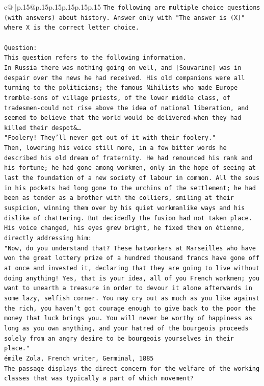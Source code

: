 \documentclass{article}
\begin{document}
{\begin{supertabular}{c@{$\;$}|p{.15\linewidth}@{}p{.15\linewidth}p{.15\linewidth}p{.15\linewidth}p{.15\linewidth}p{.15\linewidth}}
{{{\texttt{The following are multiple choice questions (with answers) about history. Answer only with "The answer is (X)" where X is the correct letter choice.} \\
\\ 
\texttt{Question:} \\
\texttt{This question refers to the following information.} \\
\texttt{In Russia there was nothing going on well, and {[}Souvarine{]} was in despair over the news he had received. His old companions were all turning to the politicians; the famous Nihilists who made Europe tremble{-}sons of village priests, of the lower middle class, of tradesmen{-}could not rise above the idea of national liberation, and seemed to believe that the world would be delivered{-}when they had killed their despot\&…} \\
\texttt{"Foolery! They'll never get out of it with their foolery."} \\
\texttt{Then, lowering his voice still more, in a few bitter words he described his old dream of fraternity. He had renounced his rank and his fortune; he had gone among workmen, only in the hope of seeing at last the foundation of a new society of labour in common. All the sous in his pockets had long gone to the urchins of the settlement; he had been as tender as a brother with the colliers, smiling at their suspicion, winning them over by his quiet workmanlike ways and his dislike of chattering. But decidedly the fusion had not taken place.} \\
\texttt{His voice changed, his eyes grew bright, he fixed them on étienne, directly addressing him:} \\
\texttt{"Now, do you understand that? These hatworkers at Marseilles who have won the great lottery prize of a hundred thousand francs have gone off at once and invested it, declaring that they are going to live without doing anything! Yes, that is your idea, all of you French workmen; you want to unearth a treasure in order to devour it alone afterwards in some lazy, selfish corner. You may cry out as much as you like against the rich, you haven't got courage enough to give back to the poor the money that luck brings you. You will never be worthy of happiness as long as you own anything, and your hatred of the bourgeois proceeds solely from an angry desire to be bourgeois yourselves in their place."} \\
\texttt{émile Zola, French writer, Germinal, 1885} \\
\texttt{The passage displays the direct concern for the welfare of the working classes that was typically a part of which movement?} \\
}}}
\end{supertabular}}
\end{document}
